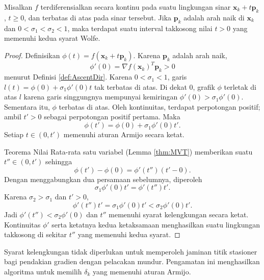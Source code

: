 \begin{lemma} Misalkan $f$ terdiferensialkan secara kontinu pada suatu lingkungan sinar $\mathbf{x}_k+t\mathbf{p}_k$, $t\geq0$, dan terbatas di atas pada sinar tersebut. Jika $\mathbf{p}_k$ adalah arah naik di $\mathbf{x}_k$ dan $0<\sigma_1<\sigma_2<1$, maka terdapat suatu interval takkosong nilai $t>0$ yang memenuhi kedua syarat Wolfe.
\label{lem:WolfeConditions}
\end{lemma}
\begin{proof}
Definisikan $\phi(t)=f(\mathbf{x}_k+t\mathbf{p}_k)$. Karena $\mathbf{p}_k$ adalah arah naik,
\begin{displaymath}
\phi'(0)=\nabla f(\mathbf{x}_k)^T\mathbf{p}_k>0
\end{displaymath}
menurut Definisi \ref{def:AscentDir}. Karena $0<\sigma_1<1$, garis
$l(t)=\phi(0)+\sigma_1\phi'(0)t$ tak terbatas di atas. Di dekat $0$, grafik $\phi$ terletak di atas $l$ karena garis singgungnya mempunyai kemiringan $\phi'(0)>\sigma_1\phi'(0)$. Sementara itu, $\phi$ terbatas di atas. Oleh kontinuitas, terdapat perpotongan positif; ambil $t'>0$ sebagai perpotongan positif pertama. Maka
\begin{displaymath}
\phi(t')=\phi(0)+\sigma_1\phi'(0)t'.
\end{displaymath}
Setiap $t\in(0,t')$ memenuhi aturan Armijo secara ketat.

Teorema Nilai Rata-rata satu variabel (Lemma \ref{thm:MVT}) memberikan suatu $t''\in(0,t')$ sehingga
\begin{displaymath}
\phi(t')-\phi(0)=\phi'(t'')(t'-0).
\end{displaymath}
Dengan menggabungkan dua persamaan sebelumnya, diperoleh
\begin{displaymath}
\sigma_1\phi'(0)t'=\phi'(t'')t'.
\end{displaymath}
Karena $\sigma_2>\sigma_1$ dan $t'>0$,
\begin{displaymath}
\phi'(t'')t'=\sigma_1\phi'(0)t'<\sigma_2\phi'(0)t'.
\end{displaymath}
Jadi $\phi'(t'')<\sigma_2\phi'(0)$ dan $t''$ memenuhi syarat kelengkungan secara ketat. Kontinuitas $\phi'$ serta ketatnya kedua ketaksamaan menghasilkan suatu lingkungan takkosong di sekitar $t''$ yang memenuhi kedua syarat.
\end{proof}

\begin{remark} Syarat kelengkungan tidak diperlukan untuk memperoleh jaminan titik stasioner bagi pendakian gradien dengan pelacakan mundur. Pengamatan ini menghasilkan algoritma untuk memilih $\delta_k$ yang memenuhi aturan Armijo.
\end{remark}

